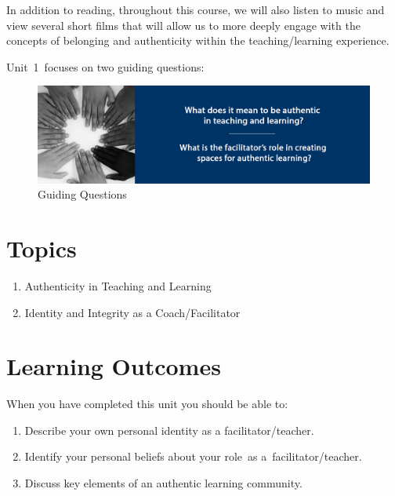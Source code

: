 \documentclass[
]{book}
\begin{document}
In addition to reading, throughout this course, we will also listen to music and view several short films that will allow us to more deeply engage with the concepts of belonging and authenticity within the teaching/learning experience.

Unit~1~focuses on two guiding questions:

\begin{figure}
\centering
\includegraphics{assets/unit1/LDRS664-BannerUnit1.jpg}
\caption{Guiding Questions}
\end{figure}

\hypertarget{topics}{%
\section*{Topics}\label{topics}}

\begin{enumerate}
\def\labelenumi{\arabic{enumi}.}
\item
  Authenticity in Teaching and Learning
\item
  Identity and Integrity as a Coach/Facilitator
\end{enumerate}

\hypertarget{learning-outcomes}{%
\section*{Learning Outcomes}\label{learning-outcomes}}

When you have completed this unit you should be able to:

\begin{enumerate}
\def\labelenumi{\arabic{enumi}.}
\item
  Describe your own personal identity as a facilitator/teacher.
\item
  Identify your personal beliefs about your role~as a~facilitator/teacher.
\item
  Discuss key elements of an authentic learning community.
\end{enumerate}
\end{document}
